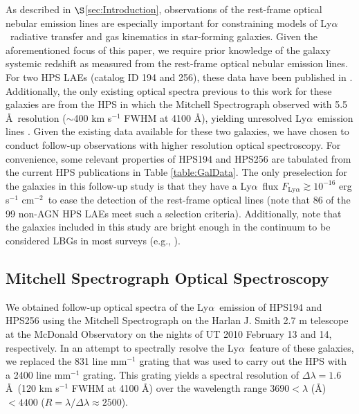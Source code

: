 \documentclass{emulateapj}
\newcommand{\lya}{Ly$\alpha$}
\newcommand{\fluxcgs}{erg s$^{-1}$ cm$^{-2}$}
\begin{document}
As described in $\S$\ref{sec:Introduction}, observations of the rest-frame optical nebular emission lines are especially important for constraining models of \lya\ radiative transfer and gas kinematics in star-forming galaxies. Given the aforementioned focus of this paper, we require prior knowledge of the galaxy systemic redshift as measured from the rest-frame optical nebular emission lines. For two HPS LAEs (catalog ID 194 and 256), these data have been published in \citet{finkelstein2011}. Additionally, the only existing optical spectra previous to this work for these galaxies are from the HPS in which the Mitchell Spectrograph observed with 5.5 \AA\ resolution ($\sim$400 km s$^{-1}$ FWHM at 4100 \AA), yielding unresolved \lya\ emission lines \citep{adams2011}. Given the existing data available for these two galaxies, we have chosen to conduct follow-up observations with higher resolution optical spectroscopy. For convenience, some relevant properties of HPS194 and HPS256 are tabulated from the current HPS publications in Table \ref{table:GalData}. The only preselection for the galaxies in this follow-up study is that they have a \lya\ flux $F_{\mathrm{Ly}\alpha} \gtrsim 10^{-16}$ \fluxcgs\ to ease the detection of the rest-frame optical lines (note that 86 of the 99 non-AGN HPS LAEs meet such a selection criteria). Additionally, note that the galaxies included in this study are bright enough in the continuum to be considered LBGs in most surveys (e.g., \citealp{steidel2004}).  

\subsection{Mitchell Spectrograph Optical Spectroscopy}\label{subsec:VPobs}
We obtained follow-up optical spectra of the \lya\ emission of HPS194 and HPS256 using the Mitchell Spectrograph \citep{hill2008b} on the Harlan J. Smith 2.7 m telescope at the McDonald Observatory on the nights of UT 2010 February 13 and 14, respectively. In an attempt to spectrally resolve the \lya\ feature of these galaxies, we replaced the 831 line mm$^{-1}$ grating that was used to carry out the HPS with a 2400 line mm$^{-1}$ grating. This grating yields a spectral resolution of $\Delta\lambda = 1.6$ \AA\ (120 km s$^{-1}$ FWHM at 4100 \AA) over the wavelength range $3690<\lambda$ (\AA) $<4400$ ($R = \lambda/\Delta\lambda \approx 2500$). 
\end{document}
